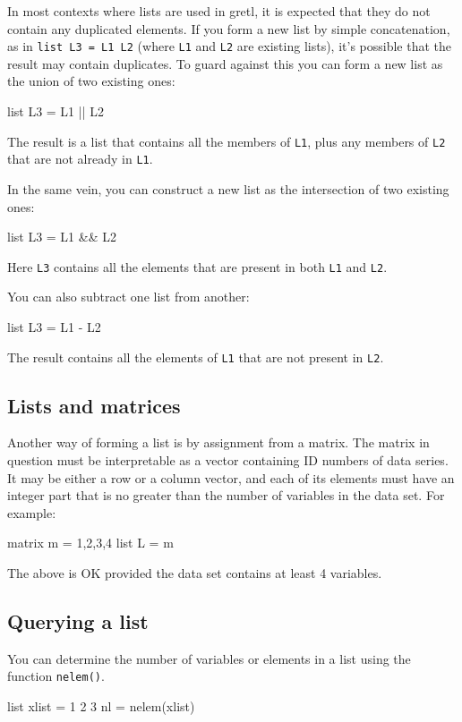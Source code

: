 In most contexts where lists are used in gretl, it is expected
that they do not contain any duplicated elements.  If you form a new
list by simple concatenation, as in \texttt{list L3 = L1 L2}
(where \texttt{L1} and \texttt{L2} are existing lists), it's possible
that the result may contain duplicates.  To guard against this you can
form a new list as the union of two existing ones:
%
\begin{code}
list L3 = L1 || L2
\end{code}
%
The result is a list that contains all the members of \texttt{L1},
plus any members of \texttt{L2} that are not already in \texttt{L1}.

In the same vein, you can construct a new list as the intersection of
two existing ones:
%
\begin{code}
list L3 = L1 && L2
\end{code}
%
Here \texttt{L3} contains all the elements that are present in both
\texttt{L1} and \texttt{L2}.

You can also subtract one list from another:
%
\begin{code}
list L3 = L1 - L2
\end{code}
%
The result contains all the elements of \texttt{L1} that are not 
present in \texttt{L2}.


\subsection{Lists and matrices}

Another way of forming a list is by assignment from a matrix.  The
matrix in question must be interpretable as a vector containing ID
numbers of data series.  It may be either a row or a column
vector, and each of its elements must have an integer part that is
no greater than the number of variables in the data set.  For example:
%
\begin{code}
matrix m = {1,2,3,4}
list L = m
\end{code}
%
The above is OK provided the data set contains at least 4 variables.

\subsection{Querying a list}

You can determine the number of variables or elements in a list
using the function \texttt{nelem()}.
%
\begin{code}
list xlist = 1 2 3
nl = nelem(xlist)
\end{code}

